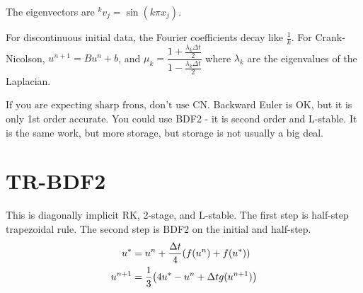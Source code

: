 \documentclass{article}
\newcommand{\Dt}{\Delta t}
\begin{document}
            The eigenvectors are ${}^kv_j = \sin(k\pi x_j)$.

            For discontinuous initial data, the Fourier coefficients decay like $\frac{1}{k}$.  For Crank-Nicolson, $u^{n+1} = Bu^n + b$, and $\mu_k = \dfrac{1 + \frac{\lambda_k\Dt}{2}}{1 - \frac{\lambda_k\Dt}{2}}$ where $\lambda_k$ are the eigenvalues of the Laplacian.

            $\boxed{\text{If you are expecting sharp frons, don't use CN.}}$  Backward Euler is OK, but it is only 1st order accurate.  You could use BDF2 - it is second order and L-stable.  It is the same work, but more storage, but storage is not usually a big deal.

    \section{TR-BDF2}

        This is diagonally implicit RK, 2-stage, and L-stable.  The first step is half-step trapezoidal rule.  The second step is BDF2 on the initial and half-step.
        \begin{align*}
            u^* &= u^n + \frac{\Dt}{4}\qty(f(u^n) + f(u^*)) \\
            u^{n+1} &= \frac{1}{3} \qty(4u^* - u^n + \Dt g(u^{n+1}))
        \end{align*}
\end{document}
